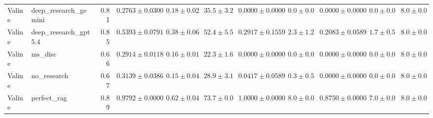 \begin{table}[htbp]
\begin{tabular}{llrrrrrrrrr}
Valine & deep_research_gemini & 0.81 & \cellcolor{red!25}$0.2763 \pm 0.0300$ & $0.18 \pm 0.02$ & $35.5 \pm 3.2$ & $0.0000 \pm 0.0000$ & $0.0 \pm 0.0$ & $0.0000 \pm 0.0000$ & $0.0 \pm 0.0$ & $8.0 \pm 0.0$ \\
Valine & deep_research_gpt5.4 & 0.85 & $0.5393 \pm 0.0791$ & $0.38 \pm 0.06$ & $52.4 \pm 5.5$ & $0.2917 \pm 0.1559$ & $2.3 \pm 1.2$ & $0.2083 \pm 0.0589$ & $1.7 \pm 0.5$ & $8.0 \pm 0.0$ \\
Valine & ms_disc & 0.66 & $0.2914 \pm 0.0118$ & $0.16 \pm 0.01$ & $22.3 \pm 1.6$ & $0.0000 \pm 0.0000$ & $0.0 \pm 0.0$ & $0.0000 \pm 0.0000$ & $0.0 \pm 0.0$ & $8.0 \pm 0.0$ \\
Valine & no_research & 0.67 & $0.3139 \pm 0.0386$ & $0.15 \pm 0.04$ & $28.9 \pm 3.1$ & $0.0417 \pm 0.0589$ & $0.3 \pm 0.5$ & $0.0000 \pm 0.0000$ & $0.0 \pm 0.0$ & $8.0 \pm 0.0$ \\
Valine & perfect_rag & 0.89 & \cellcolor{green!25}$0.9792 \pm 0.0000$ & $0.62 \pm 0.04$ & $73.7 \pm 0.0$ & $1.0000 \pm 0.0000$ & $8.0 \pm 0.0$ & $0.8750 \pm 0.0000$ & $7.0 \pm 0.0$ & $8.0 \pm 0.0$ \\
\bottomrule
\end{tabular}
\end{table}